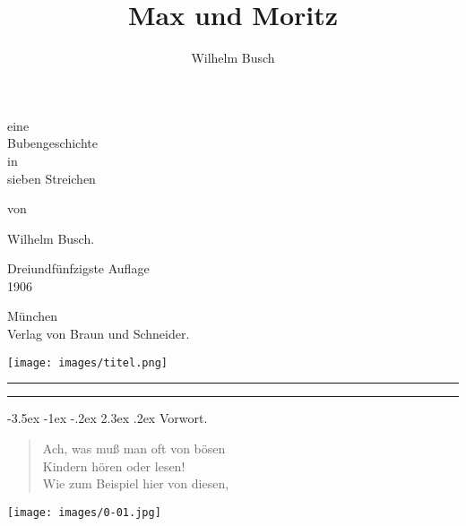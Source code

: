 \documentclass[a4paper,12pt]{article}
\makeatletter
\renewcommand\section{\@startsection {section}{1}{\z@}%
                                   {-3.5ex \@plus -1ex \@minus -.2ex}%
                                   {2.3ex \@plus.2ex}%
                                   {\centering\normalfont\LARGE\bfseries}}
\makeatother
\begin{document}
\title{Max und Moritz}
\author{Wilhelm Busch}
\maketitle


\begin{center}
eine\\
Bubengeschichte\\
in\\
sieben Streichen  
\end{center}

\begin{center}
von
\end{center}

\begin{center}
Wilhelm Busch.  
\end{center}


\begin{center}
Dreiundfünfzigste Auflage\\
1906 
\end{center}



\begin{center}
München\\
Verlag von Braun und Schneider.
\end{center}




\begin{center}\texttt{[image: images/titel.png]}\end{center}


\bigskip
\hrule

\clearpage
\tableofcontents


\bigskip
\hrule

\clearpage
\section{Vorwort.\label{Vorwort}}


\begin{verse}
Ach, was muß man oft von bösen\\{}
Kindern hören oder lesen!\\{}
Wie zum Beispiel hier von diesen,
\end{verse}



\begin{center}\texttt{[image: images/0-01.jpg]}\end{center}
\end{document}
